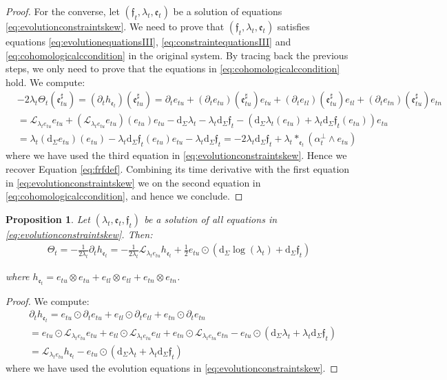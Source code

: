 \documentclass[10pt,reqno,a4paper]{amsart}
\theoremstyle{plain}
\newtheorem{prop}[thm]{Proposition}
\theoremstyle{definition}
\theoremstyle{remark}
\theoremstyle{remark}
\def\dd{\mathrm{d}}
\def\cL{\mathcal{L}}
\def\cL{\mathcal{L}}
\def\fre{\mathfrak{e}}
\renewcommand{\(}{ (}
\renewcommand{\)}{ )}
\newcommand{\frf}{\mathfrak{f}}
\begin{document}
\begin{proof}
 \noindent
For the converse, let $(\frf_t,\lambda_t,\fre_t)$ be a solution of equations \eqref{eq:evolutionconstraintskew}. We need to prove that $(\frf_t,\lambda_t,\fre_t)$ satisfies equations  \eqref{eq:evolutionequationsIII}, \eqref{eq:constraintequationsIII} and \eqref{eq:cohomologicalccondition} in the original system. By tracing back the previous steps, we only need to prove that the equations in \eqref{eq:cohomologicalccondition} hold. We compute:
\begin{eqnarray*}
& -2\lambda_t \Theta_t (\fre_{tu}^{\sharp}) =  (\partial_t h_{\fre_t})(\fre_{tu}^{\sharp}) =  \partial_t e_{tu} + (\partial_t e_{tu})(\fre_{tu}^{\sharp}) e_{tu} + (\partial_t e_{tl})(\fre_{tu}^{\sharp}) e_{tl} + (\partial_t e_{tn})(\fre_{tu}^{\sharp}) e_{tn}\\
& =  \cL_{\lambda_t e_{tu}} e_{tu} + (\cL_{\lambda_t e_{tu}} e_{tu}) (e_{tu}) e_{tu} - \dd_{\Sigma}\lambda_t - \lambda_t \dd_{\Sigma} \frf_t - (\dd_{\Sigma}\lambda_t(e_{tu}) + \lambda_t \dd_{\Sigma} \frf_t (e_{tu}))e_{tu} \\
&  = \lambda_t (\dd_{\Sigma} e_{tu} )(e_{tu}) - \lambda_t \dd_{\Sigma} \frf_t (e_{tu}) e_{tu} - \lambda_t \dd_{\Sigma} \frf_t = -2\lambda_t \dd_{\Sigma} \frf_t + \lambda_t\ast_{\fre_t} (\alpha^{\perp}_t \wedge e_{tu})
\end{eqnarray*}
where we have used the third equation in \eqref{eq:evolutionconstraintskew}. Hence we recover Equation \eqref{eq:frfdef}. Combining its time derivative with the first equation in \eqref{eq:evolutionconstraintskew} we on the second equation in \eqref{eq:cohomologicalccondition}, and hence we conclude.
\end{proof}

\begin{prop}
\label{prop:Thetaevolution}
Let $(\lambda_t,\fre_t,\frf_t)$ be a solution of all equations in \eqref{eq:evolutionconstraintskew}. Then:
\begin{eqnarray}
\Theta_t = -\frac{1}{2\lambda_t} \partial_t h_{\fre_t} =  -\frac{1}{2\lambda_t} \cL_{\lambda_t e_{tu}} h_{\fre_t}  + \frac{1}{2} e_{tu}\odot (\dd_{\Sigma} \log(\lambda_t) + \dd_{\Sigma}\frf_t)
\end{eqnarray}

\noindent
where $h_{\fre_t} = e_{tu}\otimes e_{tu} + e_{tl}\otimes e_{tl} + e_{tn}\otimes e_{tn}$.
\end{prop}

\begin{proof}
We compute:
\begin{eqnarray*}
& \partial_t h_{\fre_t} = e_{tu} \odot \partial_t e_{tu} + e_{tl} \odot \partial_t e_{tl} + e_{tn} \odot \partial_t e_{tn} \\
& = e_{tu} \odot \cL_{\lambda_t e_{tu}} e_{tu} + e_{tl} \odot \cL_{\lambda_t e_{tu}} e_{tl} + e_{tn} \odot \cL_{\lambda_t e_{tu}} e_{tn} - e_{tu}\odot ( \dd_{\Sigma}\lambda_t + \lambda_t \dd_{\Sigma} \frf_t) \\
& = \cL_{\lambda_t e_{tu}} h_{\fre_t} - e_{tu}\odot (\dd_{\Sigma}\lambda_t + \lambda_t \dd_{\Sigma}\frf_t)
\end{eqnarray*}
where we have used the evolution equations in \eqref{eq:evolutionconstraintskew}.
\end{proof} 
\end{document}
